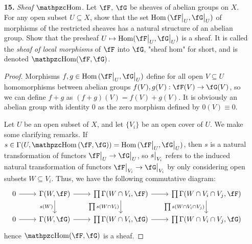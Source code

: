 \documentclass[a4paper]{article}
\begin{document}
\begin{enumerate} [label=\textbf{\arabic*.}, leftmargin=0em]
          \begin{proof}
              We show $U - \text{Supp}~s$ is an open set. If $Q \in U$ such that $s_Q = 0$, then by definition of the direct limit, there exists an open neighborhood $V$ of $Q$ in $U$ such that $0 = (V, \restr{s}{V}) \in \fF_Q$, hence $s_R = 0$ for all $R \in V$.
          \end{proof}

    \item[\textbf{15.}] \textit{Sheaf $\rHom$.} Let $\fF$, $\fG$ be sheaves of abelian groups on $X$. For any open subset $U \subseteq X$, show that the set $\Hom{(\restr{\fF}{U}, \restr{\fG}{U})}$ of morphisms of the restricted sheaves has a natural structure of an abelian group. Show that the presheaf $U \mapsto \Hom(\restr{\fF}{U}, \restr{\fG}{U})$ is a sheaf. It is called the \textit{sheaf of local morphisms} of $\fF$ into $\fG$, "sheaf hom" for short, and is denoted $\rHom(\fF, \fG)$.

          \begin{proof}
              Morphisms $f, g \in \Hom{(\restr{\fF}{U}, \restr{\fG}{U})}$ define for all open $V \subseteq U$ homomorphisms between abelian groups $f(V), g(V) : \fF(V) \to \fG(V)$, so we can define $f + g$ as $(f + g)(V) = f(V) + g(V)$. It is obviously an abelian group with identity $0$ as the zero morphism defined by $0(V) \equiv 0$.

              Let $U$ be an open subset of $X$, and let $\{ V_i \}$ be an open cover of $U$. We make some clarifying remarks. If $s \in \Gamma(U, \rHom{(\fF, \fG)}) = \Hom{(\restr{\fF}{U}, \restr{\fG}{U})}$, then $s$ is a natural transformation of functors $\restr{\fF}{U} \to \restr{\fG}{U}$, so $\restr{s}{V_i}$ refers to the induced natural transformation of functors $\restr{\fF}{V_i} \to \restr{\fG}{V_i}$ by only considering open subsets $W \subseteq V_i$. Thus, we have the following commutative diagram:
              \[ \begin{tikzcd}
                      0 \arrow[r] & {\Gamma(W, \fF)} \arrow[r] \arrow[d, "s(W)"'] & {\prod \Gamma(W \cap V_i, \fF)} \arrow[r] \arrow[d, "\prod s(W \cap V_i)"'] & {\prod \Gamma(W \cap V_i \cap V_j, \fF)} \arrow[d, "\prod s(W \cap V_i \cap V_j)"'] \\
                      0 \arrow[r]           & {\Gamma(W, \fG)} \arrow[r]                    & {\prod \Gamma(W \cap V_i, \fG)} \arrow[r]                                   & {\prod \Gamma(W \cap V_i \cap V_j, \fG)}
                  \end{tikzcd} \]
              hence $\rHom(\fF, \fG)$ is a sheaf.
          \end{proof}


\end{enumerate}
\end{document}
